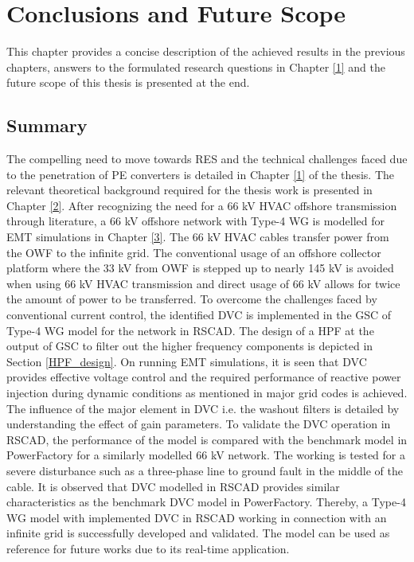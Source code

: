 \chapter{Conclusions and Future Scope}\label{6}

This chapter provides a concise description of the achieved results in the previous chapters, answers to the formulated research questions in Chapter \ref{1} and the future scope of this thesis is presented at the end.

\section{Summary}
The compelling need to move towards \gls{RES} and the technical challenges faced due to the penetration of \gls{PE} converters is detailed in Chapter \ref{1} of the thesis. The relevant theoretical background required for the thesis work is presented in Chapter \ref{2}. After recognizing the need for a 66 kV \gls{HVAC} offshore transmission through literature, a 66 kV offshore network with Type-4 \gls{WG} is modelled for \gls{EMT} simulations in Chapter \ref{3}. The 66 kV \gls{HVAC} cables transfer power from the \gls{OWF} to the infinite grid. The conventional usage of an offshore collector platform where the 33 kV from \gls{OWF} is stepped up to nearly 145 kV is avoided when using 66 kV \gls{HVAC} transmission and direct usage of 66 kV allows for twice the amount of power to be transferred. To overcome the challenges faced by conventional current control, the identified \gls{DVC} is implemented in the \gls{GSC} of Type-4 \gls{WG} model for the network in RSCAD. The design of a \gls{HPF} at the output of \gls{GSC} to filter out the higher frequency components is depicted in Section \ref{HPF_design}. On running \gls{EMT} simulations, it is seen that \gls{DVC} provides effective voltage control and the required performance of reactive power injection during dynamic conditions as mentioned in major grid codes \cite{mohseni_review_2012} is achieved. The influence of the major element in \gls{DVC} i.e. the washout filters is detailed by understanding the effect of gain parameters. To validate the \gls{DVC} operation in RSCAD, the performance of the model is compared with the benchmark model in PowerFactory \cite{korai_dynamic_2019} for a similarly modelled 66 kV network. The working is tested for a severe disturbance such as a three-phase line to ground fault in the middle of the cable. It is observed that \gls{DVC} modelled in RSCAD provides similar characteristics as the benchmark \gls{DVC} model in PowerFactory. Thereby, a Type-4 \gls{WG} model with implemented \gls{DVC} in RSCAD working in connection with an infinite grid is successfully developed and validated. The model can be used as reference for future works due to its real-time application.  


